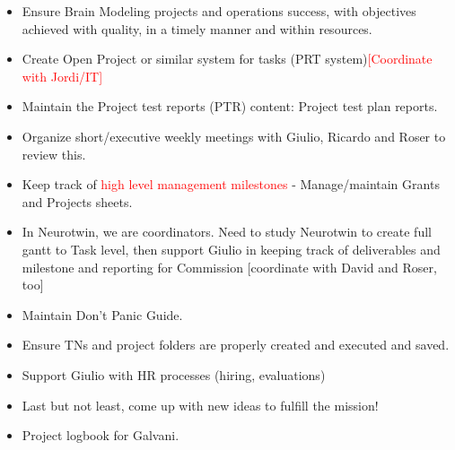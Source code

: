 \begin{itemize}
    \item	Ensure Brain Modeling projects and operations success, with objectives achieved with quality, in a timely manner and within resources. 
\item Create Open Project or similar system for tasks (PRT system)\textcolor{red}{[Coordinate with Jordi/IT]} 
\item Maintain the Project test reports (PTR) content: Project test plan reports. 
\item Organize short/executive weekly meetings with Giulio, Ricardo and Roser to review this. 
\item Keep track of \textcolor{red}{high level management milestones} - Manage/maintain Grants and Projects sheets. 
\item In Neurotwin, we are coordinators. Need to study Neurotwin to create full gantt to Task level, then support Giulio in keeping track of deliverables and milestone and reporting for Commission [coordinate with David and Roser, too] 
\item Maintain Don’t Panic Guide. 
\item Ensure TNs and project folders are properly created and executed and saved. 
\item Support Giulio with HR processes (hiring, evaluations) 
\item Last but not least, come up with new ideas to fulfill the mission!
\item Project logbook for Galvani.

\end{itemize}